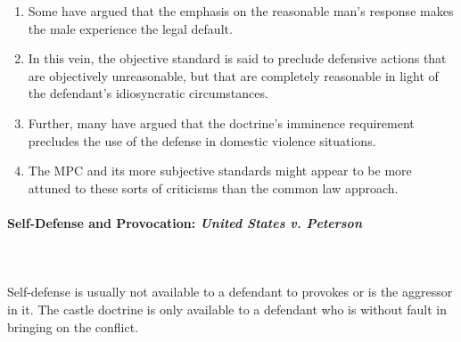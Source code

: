 \begin{enumerate}
\begin{enumerate}
        \item Some have argued that the emphasis on the reasonable man's 
        response makes the male experience the legal default.
        \item In this vein, the objective standard is said to preclude 
        defensive actions that are objectively unreasonable, but that are 
        completely reasonable in light of the defendant's idiosyncratic 
        circumstances.
        \item Further, many have argued that the doctrine's imminence 
        requirement precludes the use of the defense in domestic violence 
        situations.
        \item The MPC and its more subjective standards might appear to be 
        more attuned to these sorts of criticisms than the common law 
        approach. 
    \end{enumerate}
\end{enumerate}

\paragraph{Self-Defense and Provocation: \emph{United States v. Peterson}}
~\\\\
Self-defense is usually not available to a defendant to provokes or is the 
aggressor in it. The castle doctrine is only available to a defendant who is 
without fault in bringing on the conflict.

